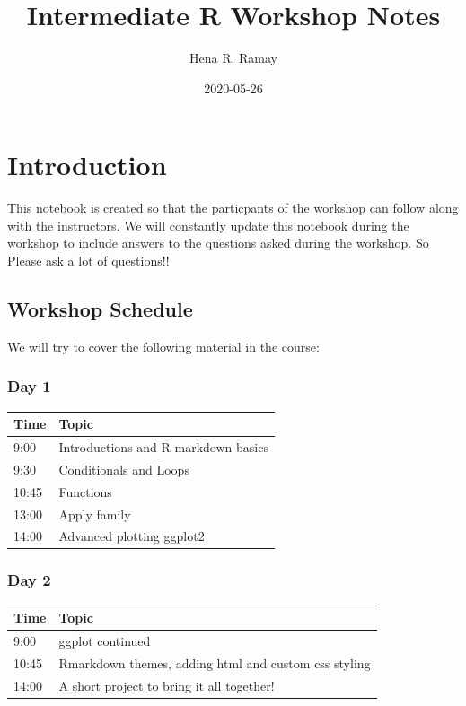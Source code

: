 \documentclass[
]{book}
\title{Intermediate R Workshop Notes}
\author{Hena R. Ramay}
\date{2020-05-26}
\begin{document}
\maketitle

{
\setcounter{tocdepth}{1}
\tableofcontents
}
\hypertarget{introduction}{%
\chapter{Introduction}\label{introduction}}

This notebook is created so that the particpants of the workshop can follow along with the instructors. We will constantly update this notebook during the workshop to include answers to the questions asked during the workshop. So Please ask a lot of questions!!

\hypertarget{workshop-schedule}{%
\section{Workshop Schedule}\label{workshop-schedule}}

We will try to cover the following material in the course:

\hypertarget{day-1}{%
\subsection*{Day 1}\label{day-1}}

\begin{longtable}[]{@{}ll@{}}
\toprule
Time & Topic\tabularnewline
\midrule
\endhead
9:00 & Introductions and R markdown basics\tabularnewline
9:30 & Conditionals and Loops\tabularnewline
10:45 & Functions\tabularnewline
13:00 & Apply family\tabularnewline
14:00 & Advanced plotting ggplot2\tabularnewline
\bottomrule
\end{longtable}

\hypertarget{day-2}{%
\subsection*{Day 2}\label{day-2}}

\begin{longtable}[]{@{}ll@{}}
\toprule
Time & Topic\tabularnewline
\midrule
\endhead
9:00 & ggplot continued\tabularnewline
10:45 & Rmarkdown themes, adding html and custom css styling\tabularnewline
14:00 & A short project to bring it all together!\tabularnewline
\bottomrule
\end{longtable}
\end{document}
